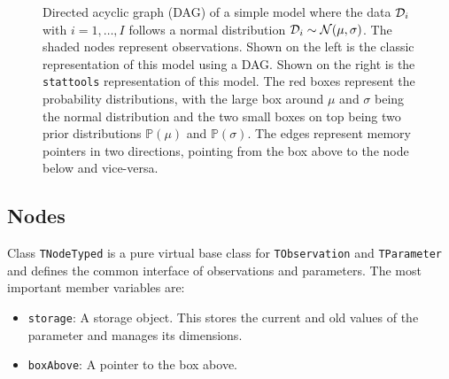 \documentclass[a4paper,11pt]{article}
\def\D{{\cal D}}
\def\bD{\boldsymbol{{\cal D}}}
\def\p{\mathbb{P}}
\def\stattools{\texttt{stattools}}
\newcommand{\class}[1]{\texttt{#1}}
\newcommand{\privparam}[1]{\texttt{\textunderscore #1}}
\begin{document}
\begin{figure}[h]
\centering
 \begin{minipage}{.3\textwidth}
\end{minipage}%
\begin{minipage}{.3\textwidth}
\end{minipage}
 \caption{Directed acyclic graph (DAG) of a simple model where the data $\D_i$ with $i = 1, \ldots, I$ follows a normal distribution $\D_i \sim {\cal N}(\mu, \sigma)$. The shaded nodes represent observations. Shown on the left is the classic representation of this model using a DAG. Shown on the right is the \stattools{} representation of this model. The red boxes represent the probability distributions, with the large box around $\mu$ and $\sigma$ being the normal distribution and the two small boxes on top being two prior distributions $\p(\mu)$ and $\p(\sigma)$. The edges represent memory pointers in two directions, pointing from the box above to the node below and vice-versa.}
 \label{fig:easyDAG}
\end{figure}

\subsection{Nodes}
Class \class{TNodeTyped} is a pure virtual base class for \class{TObservation} and \class{TParameter} and defines the common interface of observations and parameters. The most important member variables are:
\begin{itemize}
 \item \privparam{storage}: A storage object. This stores the current and old values of the parameter and manages its dimensions.
 \item \privparam{boxAbove}: A pointer to the box above.
 \end{itemize}
\end{document}
